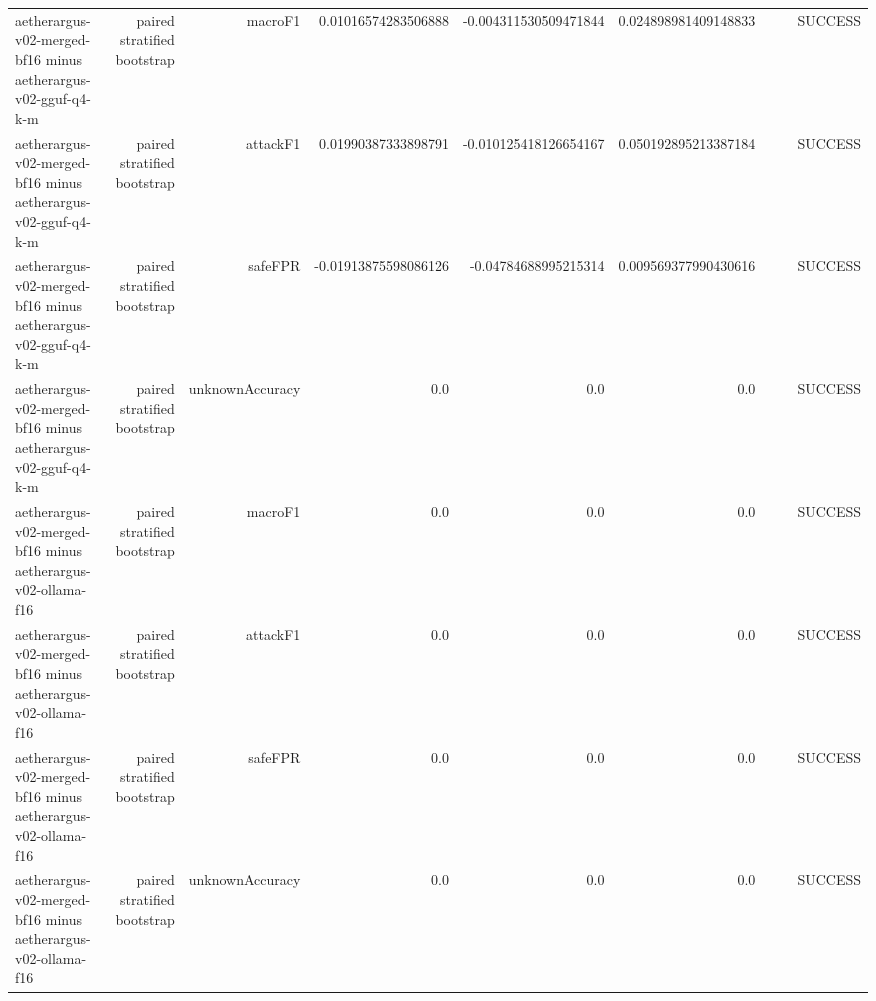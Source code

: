 \begin{table}[t]
\begin{tabular}{lrrrrrrrr}
aetherargus-v02-merged-bf16 minus aetherargus-v02-gguf-q4-k-m & paired stratified bootstrap & macroF1 & 0.01016574283506888 & -0.004311530509471844 & 0.024898981409148833 &  &  & SUCCESS \\
aetherargus-v02-merged-bf16 minus aetherargus-v02-gguf-q4-k-m & paired stratified bootstrap & attackF1 & 0.01990387333898791 & -0.010125418126654167 & 0.050192895213387184 &  &  & SUCCESS \\
aetherargus-v02-merged-bf16 minus aetherargus-v02-gguf-q4-k-m & paired stratified bootstrap & safeFPR & -0.01913875598086126 & -0.04784688995215314 & 0.009569377990430616 &  &  & SUCCESS \\
aetherargus-v02-merged-bf16 minus aetherargus-v02-gguf-q4-k-m & paired stratified bootstrap & unknownAccuracy & 0.0 & 0.0 & 0.0 &  &  & SUCCESS \\
aetherargus-v02-merged-bf16 minus aetherargus-v02-ollama-f16 & paired stratified bootstrap & macroF1 & 0.0 & 0.0 & 0.0 &  &  & SUCCESS \\
aetherargus-v02-merged-bf16 minus aetherargus-v02-ollama-f16 & paired stratified bootstrap & attackF1 & 0.0 & 0.0 & 0.0 &  &  & SUCCESS \\
aetherargus-v02-merged-bf16 minus aetherargus-v02-ollama-f16 & paired stratified bootstrap & safeFPR & 0.0 & 0.0 & 0.0 &  &  & SUCCESS \\
aetherargus-v02-merged-bf16 minus aetherargus-v02-ollama-f16 & paired stratified bootstrap & unknownAccuracy & 0.0 & 0.0 & 0.0 &  &  & SUCCESS \\
\bottomrule
\end{tabular}
\end{table}
